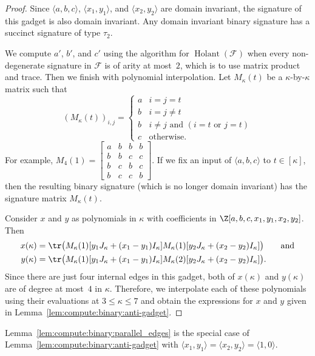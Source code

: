\documentclass[11pt]{article}
\newcommand{\Holant}{\operatorname{Holant}}
\newenvironment{remark}{\medskip{\bfseries \noindent Remark:}}{\par\medskip}{\par\medskip}
\begin{document}
\begin{proof}
 Since $\langle a,b,c \rangle$, $\langle x_1, y_1 \rangle$, and $\langle x_2, y_2 \rangle$ are domain invariant,
 the signature of this gadget is also domain invariant.
 Any domain invariant binary signature has a succinct signature of type $\tau_2$.
 
 We compute $a'$, $b'$, and $c'$ using the algorithm for $\Holant(\mathcal{F})$ when every non-degenerate signature in $\mathcal{F}$ is of arity at most~$2$,
 which is to use matrix product and trace.
 Then we finish with polynomial interpolation.
 Let $M_\kappa(t)$ be a $\kappa$-by-$\kappa$ matrix such that
 \[
  (M_\kappa(t))_{i,j} =
  \begin{cases}
   a & i = j = t\\
   b & i = j \ne t\\
   b & i \ne j \text{ and } (i = t \text{ or } j = t)\\
   c & \text{otherwise}.
  \end{cases}
 \]
 For example,
 $M_4(1) = \left[\begin{smallmatrix} a & b & b & b \\ b & b & c & c \\ b & c & b & c \\ b & c & c & b \end{smallmatrix}\right]$.
 If we fix an input of $\langle a,b,c \rangle$ to $t \in [\kappa]$,
 then the resulting binary signature (which is no longer domain invariant) has the signature matrix $M_\kappa(t)$.
 
 Consider $x$ and $y$ as polynomials in $\kappa$ with coefficients in $\Z[a,b,c,x_1,y_1,x_2,y_2]$.
 Then
 \begin{align*}
  x(\kappa) &= \tr\big(M_\kappa(1) [y_1 J_\kappa + (x_1 - y_1) I_\kappa] M_\kappa(1) [y_2 J_\kappa + (x_2 - y_2) I_\kappa]\big)
  \qquad \text{and}\\
  y(\kappa) &= \tr\big(M_\kappa(1) [y_1 J_\kappa + (x_1 - y_1) I_\kappa] M_\kappa(2) [y_2 J_\kappa + (x_2 - y_2) I_\kappa]\big).
 \end{align*}
 Since there are just four internal edges in this gadget,
 both of $x(\kappa)$ and $y(\kappa)$ are of degree at most~$4$ in $\kappa$.
 Therefore, we interpolate each of these polynomials using their evaluations at $3 \le \kappa \le 7$
 and obtain the expressions for $x$ and $y$ given in Lemma~\ref{lem:compute:binary:anti-gadget}.
\end{proof}

\begin{remark}
 Lemma~\ref{lem:compute:binary:parallel_edges} is the special case of Lemma~\ref{lem:compute:binary:anti-gadget}
 with $\langle x_1, y_1 \rangle = \langle x_2, y_2 \rangle = \langle 1,0 \rangle$.
\end{remark}
\end{document}
